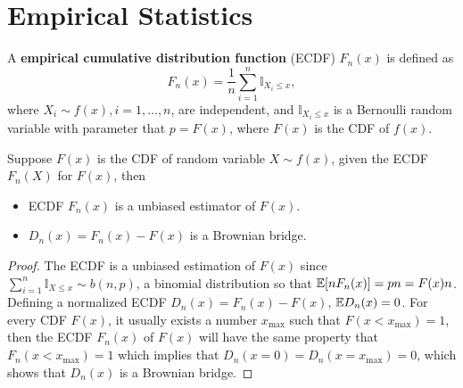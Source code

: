 \section{Empirical Statistics}

\begin{definition}
A \textbf{empirical cumulative distribution function} (ECDF) $F_n(x)$ is defined as
\begin{equation}
F_n(x)=\frac{1}{n}\sum_{i=1}^n\mathbb{I}_{X_i\le x},
\end{equation} 
where $X_i\sim f(x),i=1,\dots,n$, are independent, and $\mathbb{I}_{X_i\le x}$ is a Bernoulli random variable with parameter that $p=F(x)$, where $F(x)$ is the CDF of $f(x)$. 
\end{definition}

\begin{theorem}
Suppose $F(x)$ is the CDF of random variable $X\sim f(x)$, given the ECDF $F_n(X)$ for $F(x)$, then
\begin{itemize}
\item ECDF $F_n(x)$ is a unbiased estimator of $F(x)$.
\item $D_n(x)=F_n(x)-F(x)$ is a Brownian bridge.
\end{itemize}
\end{theorem}

\begin{proof}
The ECDF is a unbiased estimation of $F(x)$ since $\sum_{i=1}^n \mathbb{I}_{X\le x}\sim b(n,p)$, a binomial distribution so that $\mathbb{E}[nF_n(x)]=pn=F(x)n$. Defining a normalized ECDF $D_n(x)=F_n(x)-F(x)$, $\mathbb{E} D_n(x)=0$. For every CDF $F(x)$, it usually exists a number $x_{\text{max}}$ such that $F(x<x_{\text{max}})=1$, then the ECDF $F_n(x)$ of $F(x)$ will have the same property that $F_n(x<x_{\text{max}})=1$ which implies that $D_n(x=0)=D_n(x=x_{\text{max}})=0$, which shows that $D_n(x)$ is a Brownian bridge. 
\end{proof}